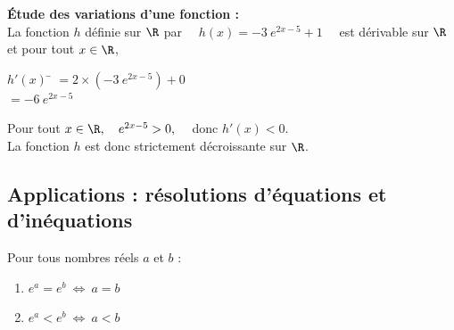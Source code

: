 \documentclass[a4paper,11pt,cours]{nsi} %
\begin{document}
\begin{exemple}[ ]
	\textbf{\'Etude des variations d'une fonction :}\\
	La fonction $h$ définie sur $\R$ par $\quad h(x)=-3\ e^{2x-5}+1\quad$ est dérivable sur $\R$ et pour tout $x\in\R$,
	\begin{tabbing}
		$h'(x)$	\= $=2\times \left(-3\ e^{2x-5}\right)+0$\\
		\>	$=-6\ e^{2x-5}$
	\end{tabbing}
	Pour tout $x\in\R, \quad e^{2x-5}>0,\quad$ donc $h'(x)<0$.\\
	La fonction $h$ est donc strictement décroissante sur $\R$.
\end{exemple}

\subsection*{Applications : résolutions d'équations et d'inéquations}

\begin{propriete}[s]
Pour tous nombres réels $a$ et $b$ :
\begin{multicols}{2}
	\begin{enumerate}[label=\textbullet]
		\item 	$e^{a}=e^{b}\ \Leftrightarrow\ a=b$
		\item 	$e^{a}<e^{b}\ \Leftrightarrow\ a<b$
	\end{enumerate}
\end{multicols}
\end{propriete}
\end{document}
